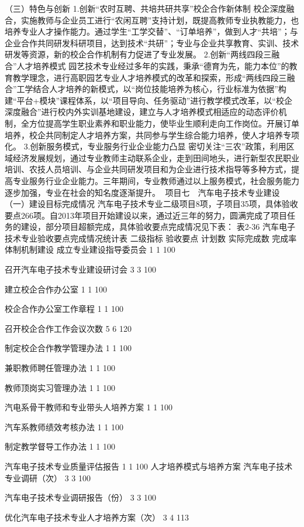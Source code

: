 （三）特色与创新
1.创新“农时互聘、共培共研共享”校企合作新体制
校企深度融合，实施教师与企业员工进行“农闲互聘”支持计划，既提高教师专业执教能力，也培养专业人才操作能力。通过学生“工学交替”、“订单培养”，做到人才“共培”；与企业合作共同研发科研项目，达到技术“共研”；专业与企业共享教育、实训、技术研发等资源，新的校企合作机制有力促进了专业发展。
2.创新“两线四段三融合”人才培养模式
园艺技术专业经过多年的实践，秉承“德育为先，能力本位”的教育教学理念，进行高职园艺专业人才培养模式的改革和探索，形成“两线四段三融合”工学结合人才培养的新模式，以“岗位技能培养为核心，行业标准为依据”构建“平台+模块”课程体系，以“项目导向、任务驱动”进行教学模式改革，以“校企深度融合”进行校内外实训基地建设，建立与人才培养模式相适应的动态评价机制，全方位提高学生职业素养和职业能力，使毕业生顺利走向工作岗位。开展订单培养，校企共同制定人才培养方案，共同参与学生综合能力培养，使人才培养专项化。
3.创新服务模式，专业服务行业企业能力凸显
密切关注“三农”政策，利用区域经济发展规划，通过专业教师主动联系企业，走到田间地头，进行新型农民职业培训、农技人员培训、与企业共同研发项目和为企业进行技术指导等多种方式，提高专业服务行业企业能力。三年期间，专业教师通过以上服务模式，社会服务能力逐步加强，专业在社会的知名度逐渐提升。
项目七　汽车电子技术专业建设
（一）建设目标完成情况
汽车电子技术专业二级项目8项，子项目35项，具体验收要点266项。自2013年项目开始建设以来，通过近三年的努力，圆满完成了项目任务的建设，部分项目超额完成，具体验收要点完成情况见下表：
表2-36  汽车电子技术专业验收要点完成情况统计表
二级指标
验收要点
计划数
实际完成数
完成率
体制机制建设
成立专业建设指导委员会
1
1
100%

召开汽车电子技术专业建设研讨会
3
3
100%

建立校企合作办公室
1
1
100%

校企合作办公室工作章程
1
1
100%

召开校企合作工作会议次数
5
6
120%

制定校企合作教学管理办法
1
1
100%

兼职教师聘任管理办法
1
1
100%

教师顶岗实习管理办法
1
1
100%

汽电系骨干教师和专业带头人培养方案
1
1
100%

汽车系教师绩效考核办法
1
1
100%

制定教学督导工作办法
1
1
100%

汽车电子技术专业质量评估报告
1
1
100%
人才培养模式与培养方案
汽车电子技术专业调研（次）
3
3
100%

汽车电子技术专业调研报告（份）
3
3
100%

优化汽车电子技术专业人才培养方案（次）
3
4
113%

